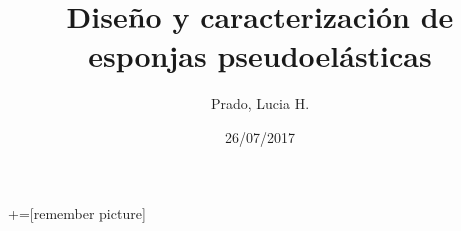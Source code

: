 \documentclass[usenames,dvipsnames]{beamer}
\title[Instituto Sabato]{Diseño y caracterización de esponjas pseudoelásticas}
\author{Prado, Lucia H.}
\institute{Instituto Sabato 
            \and División Física de Metales - Centro Atómico Bariloche  }
\date{26/07/2017}
\begin{document}
+=[remember picture]

\everymath{\displaystyle}
 
 
  \frame{\titlepage}
%  
% 
% 
%       
% 
% 
%  
% 
%  
% 
% 
% 
% 
%      
\end{document}
